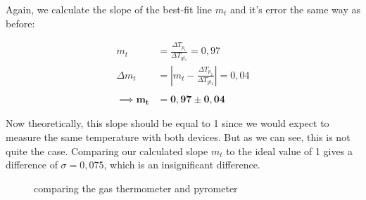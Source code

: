 \documentclass{article}
\begin{document}
Again, we calculate the slope of the best-fit line $m_t$ and it's error the same way as before:

\begin{equation}
    \begin{split}
        m_t &= \frac{\Delta T_{p_1}}{\Delta T_{gt_1}} = 0,97 \\
        \Delta m_t &= \left| m_t - \frac{\Delta T_{p_2}}{\Delta T_{gt_2}} \right| = 0,04\\ \\
        \implies \bm{m_t} &= \bm{0,97 \pm 0,04} 
    \end{split}
\end{equation}

Now theoretically, this slope should be equal to 1 since we would expect to measure the same temperature with both devices. But as we can see, this is not quite the case. Comparing our calculated slope $m_t$ to the ideal value of 1 gives a difference of $\sigma = 0,075$, which is an insignificant difference.

\begin{figure} [!p]
    \centering
    \caption{comparing the gas thermometer and pyrometer}
\end{figure}
\end{document}
